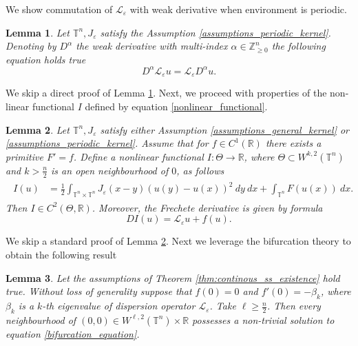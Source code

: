 \documentclass[12pt, a4paper]{article}
\theoremstyle{break}
\theoremstyle{break}
\theoremstyle{break}
\theoremstyle{break}
\newtheorem{lem}{Lemma}[section]
\theoremstyle{break}
\newcommand{\Leo}{\mathcal{L}_{\varepsilon}}
\begin{document}
We show commutation of $\Leo$ with weak derivative when environment is periodic.

\begin{lem}
    Let $\mathbb{T}^n, J_\varepsilon$ satisfy the Assumption \ref{assumptions_periodic_kernel}. Denoting by $D^{\alpha}$ the weak derivative with multi-index $\alpha \in \mathbb{Z}_{\geq 0}^n$ the following equation holds true
    \begin{equation}
        D^\alpha \Leo u = \Leo D^\alpha u.
    \end{equation}
    \label{lem:commutation_formula}
\end{lem}

We skip a direct proof of Lemma \ref{lem:commutation_formula}. Next, we proceed with properties of the non-linear functional $I$ defined by equation \eqref{nonlinear_functional}.

\begin{lem}
    Let $\mathbb{T}^n, J_\varepsilon$ satisfy either Assumption \ref{assumptions_general_kernel} or \ref{assumptions_periodic_kernel}. Assume that for $f \in C^1(\mathbb{R})$ there exists a primitive $F' = f$. Define a nonlinear functional $I:\Theta \rightarrow \mathbb{R}$, where $\Theta \subset W^{k, 2}(\mathbb{T}^n)$ and $k > \frac{n}{2}$ is an open neighbourhood of $0$, as follows
    \begin{align}
        \begin{split}
            I(u) 
            &= \frac{1}{2}\int_{\mathbb{T}^n \times \mathbb{T}^n} J_\varepsilon(x-y)\left(u(y) - u(x)\right)^2\:dy\:dx + \int_{\mathbb{T}^n} F(u(x)) \:dx. \label{nonlinear_functional}
        \end{split}
    \end{align}
    Then $I \in C^2(\Theta, \mathbb{R})$. Moreover, the Frechete derivative is given by formula
    \begin{equation*}
        DI(u) = \Leo u + f(u).
    \end{equation*}
    \label{lem:nonlinear_functional}
\end{lem}

We skip a standard proof of Lemma \ref{lem:nonlinear_functional}. Next we leverage the bifurcation theory to obtain the following result

\begin{lem}
    Let the assumptions of Theorem \ref{thm:continous_ss_existence} hold true. Without loss of generality suppose that $f(0) = 0$ and $f'(0) = -\beta_k$, where $\beta_k$ is a $k$-th eigenvalue of dispersion operator $\Leo$. Take $\ell \geq \frac{n}{2}$. Then every neighbourhood of $(0, 0) \in W^{\ell,2}(\mathbb{T}^n) \times \mathbb{R}$ possesses a non-trivial solution to equation \eqref{bifurcation_equation}.
    \label{lem:bifurcation_existence}
\end{lem}
\end{document}
